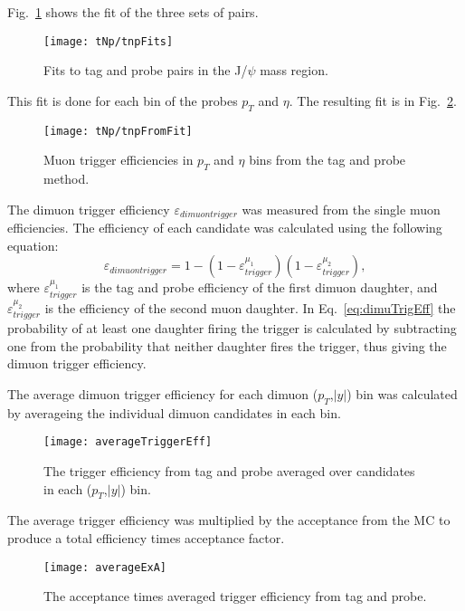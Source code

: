       Fig.~\ref{fig:tnpFitPlot} shows the fit of the three sets of pairs. 
      \begin{figure}[!Hh]
        \centering
        \texttt{[image: tNp/tnpFits]}
        \caption{Fits to tag and probe pairs in the J/$\psi$ mass region.}
        \label{fig:tnpFitPlot}
      \end{figure}
      This fit is done for each bin of the probes $p_{T}$ and $\eta$.
      The resulting fit is in Fig.~\ref{fig:tnpTrigMap}.
      \begin{figure}[!Hhbt]
        \centering
        \texttt{[image: tNp/tnpFromFit]}
        \caption{Muon trigger efficiencies in $p_{T}$ and $\eta$ bins from 
          the tag and probe method.}
        \label{fig:tnpTrigMap}
      \end{figure}

      The dimuon trigger efficiency $\varepsilon_{dimuon trigger}$ was measured
        from the single muon efficiencies. 
      The efficiency of each candidate was calculated using the following
        equation:
      \begin{equation}
        \label{eq:dimuTrigEff}
        \varepsilon_{dimuon trigger}=1-(1-\varepsilon_{trigger}^{\mu_{1}})(1-\varepsilon_{trigger}^{\mu_{2}}),
      \end{equation}
      where $\varepsilon_{trigger}^{\mu_{1}}$ is the tag and probe efficiency
        of the first dimuon daughter, and $\varepsilon_{trigger}^{\mu_{2}}$ is
        the efficiency of the second muon daughter. 
      In Eq.~\ref{eq:dimuTrigEff} the probability of at least one daughter
        firing the trigger is calculated by subtracting one from the
        probability that neither daughter fires the trigger,
        thus giving the dimuon trigger efficiency. 

      The average dimuon trigger efficiency for each dimuon ($p_{T}$,$|y|$) bin
        was calculated by averageing the individual dimuon candidates in each
        bin. 
      \begin{figure}[!Hhbt]
        \centering
        \texttt{[image: averageTriggerEff]}
        \caption{The trigger efficiency from tag and probe averaged over candidates
          in each ($p_{T}$,$|y|$) bin.}
        \label{fig:avTrigEffCo}
      \end{figure}
      The average trigger efficiency was multiplied by the acceptance from the MC 
        to produce a total efficiency times acceptance factor. 
      \begin{figure}[!Hhtb]
        \centering
        \texttt{[image: averageExA]}
        \caption{The acceptance times averaged trigger efficiency from tag and 
          probe.}
        \label{fig:avAccEff}
      \end{figure}

